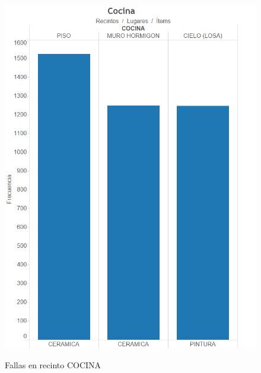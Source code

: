 \documentclass[letter,12pt,oneside]{report}
\begin{document}
\begin{figure}[H]
\begin{center}
\includegraphics[scale=0.5]{images/cocina.png}
\caption{Fallas en recinto COCINA}
\label{}
\end{center}
\end{figure}
\end{document}
